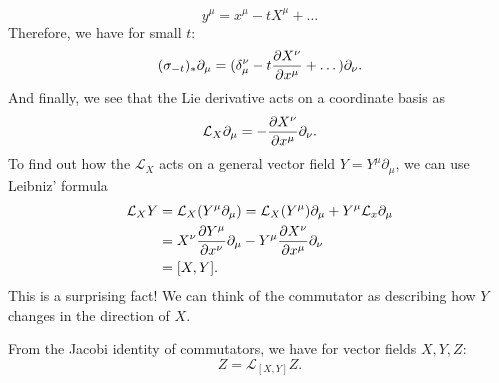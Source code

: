 \begin{equation}
  y^\mu = x^\mu -t X^\mu + \dots
\end{equation}
Therefore, we have for small $t$:
\begin{equation}
  (\sigma_{-t})_* \partial_\mu = (\delta^\nu_\mu -t \pdv{X^\nu}{x^\mu} + \dots) \partial_\nu.
\end{equation}
And finally, we see that the Lie derivative acts on a coordinate basis as
\begin{equation}
  \mathcal{L}_X \partial_\mu = -\pdv{X^\nu}{x^\mu} \partial_\nu.
\end{equation}
To find out how the $\mathcal{L}_X$ acts on a general vector field $Y = Y^\mu \partial_\mu$, we can use Leibniz' formula
\begin{align}
  \mathcal{L}_X Y &= \mathcal{L}_X (Y^\mu \partial_\mu) = \mathcal{L}_X (Y^\mu) \partial_\mu + Y^\mu \mathcal{L}_x \partial_\mu \\
		  &= X^\nu \pdv{Y^\mu}{x^\nu} \partial_\mu - Y^\mu \pdv{X^\nu}{x^\mu} \partial_\nu \\
		  &= [X, Y].
\end{align}
This is a surprising fact! We can think of the commutator as describing how $Y$ changes in the direction of $X$.
\begin{corollary}
  From the Jacobi identity of commutators, we have for vector fields $X, Y, Z$:
  \begin{equation}
    [\mathcal{L}_X, \mathcal{L}_Y] Z = \mathcal{L}_{[X, Y]}Z.
  \end{equation}
\end{corollary}
